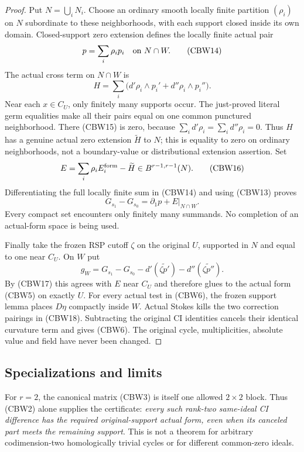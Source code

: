\begin{proof}
Put $N=\bigcup_iN_i$.  Choose an ordinary smooth locally finite
partition $(\rho_i)$ on $N$ subordinate to these neighborhoods,
with each support closed inside its own domain.  Closed-support
zero extension defines the locally finite actual pair
\[
                         p=\sum_i\rho_i p_i
                                   \quad\hbox{on }N\cap W.
 \tag{CBW14}
\]
The actual cross term on $N\cap W$ is
\[
       H=\sum_i\bigl(d'\rho_i\wedge p_i'
                              +d''\rho_i\wedge p_i''\bigr).
 \tag{CBW15}
\]
Near each $x\in C_U$, only finitely many supports occur.
The just-proved literal germ equalities make all their pairs equal
on one common punctured neighborhood.  There (CBW15) is zero,
because $\sum_i d'\rho_i=\sum_i d''\rho_i=0$.
Thus $H$ has a genuine actual zero extension $\widetilde H$ to
$N$; this is equality to zero on ordinary neighborhoods, not a
boundary-value or distributional extension assertion.
Set
\[
              E=\sum_i\rho_iE_i^{\rm form}-\widetilde H
                                         \in B^{r-1,r-1}(N).
 \tag{CBW16}
\]
Differentiating the full locally finite sum in (CBW14) and using
(CBW13) proves
\[
                  G_{s_1}-G_{s_0}=\partial_1p+E|_{N\cap W}.
 \tag{CBW17}
\]
Every compact set encounters only finitely many summands.  No
completion of an actual-form space is being used.

Finally take the frozen RSP cutoff $\zeta$ on the original $U$,
supported in $N$ and equal to one near $C_U$.  On $W$ put
\[
 g_W=G_{s_1}-G_{s_0}
             -d'(\widetilde{\zeta p'})-d''(\widetilde{\zeta p''}).
 \tag{CBW18}
\]
By (CBW17) this agrees with $E$ near $C_U$ and therefore glues
to the actual form (CBW5) on exactly $U$.  For every actual test
in (CBW6), the frozen support lemma places $D\eta$ compactly
inside $W$.  Actual Stokes kills the two correction pairings in
(CBW18).  Subtracting the original CI identities cancels their
identical curvature term and gives (CBW6).  The original cycle,
multiplicities, absolute value and field have never been changed.
\end{proof}

\subsection{Specializations and limits}

For $r=2$, the canonical matrix (CBW3) is itself one allowed
$2\times2$ block.  Thus (CBW2) alone supplies the certificate:
\emph{every such rank-two same-ideal CI difference has the required
original-support actual form, even when its canceled part meets
the remaining support}.  This is not a theorem for arbitrary
codimension-two homologically trivial cycles or for different
common-zero ideals.

